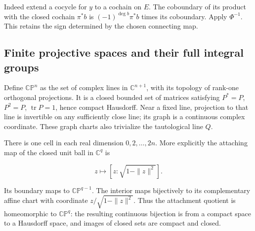 Indeed extend a cocycle for \(y\) to a cochain on \(E\). The coboundary of its product with the closed cochain \(\pi^*b\) is \((-1)^{\deg b}\pi^*b\) times its coboundary. Apply \(\Phi^{-1}\). This retains the sign determined by the chosen connecting map.

\subsection{Finite projective spaces and their full integral groups}
\label{courseIII:projective-splitting-for-lesson11:finite-projective-space}

\label{courseIII:projective-splitting-for-lesson11:section-2}\label{courseIII:projective-splitting-for-lesson11:CG-S6-PROJECTIVE-2}

Define \(\mathbb{CP}^n\) as the set of complex lines in \(\mathbb C^{n+1}\), with its topology of rank-one orthogonal projections. It is a closed bounded set of matrices satisfying \(P^*=P\), \(P^2=P\), \(\operatorname{tr}P=1\), hence compact Hausdorff. Near a fixed line, projection to that line is invertible on any sufficiently close line; its graph is a continuous complex coordinate. These graph charts also trivialize the tautological line \(Q\).

There is one cell in each real dimension \(0,2,\ldots,2n\). More explicitly the attaching map of the closed unit ball in \(\mathbb C^q\) is

\begin{equation}
z\longmapsto[z:\sqrt{1-\|z\|^2}].
\label{courseIII:projective-splitting-for-lesson11:eq:2.1}
\end{equation}

Its boundary maps to \(\mathbb{CP}^{q-1}\). The interior maps bijectively to its complementary affine chart with coordinate \(z/\sqrt{1-\|z\|^2}\). Thus the attachment quotient is homeomorphic to \(\mathbb{CP}^q\): the resulting continuous bijection is from a compact space to a Hausdorff space, and images of closed sets are compact and closed.

